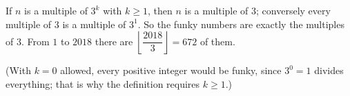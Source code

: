 If $n$ is a multiple of $3^k$ with $k\ge1$, then $n$ is a multiple of $3$; conversely every multiple of $3$ is a multiple of $3^1$. So the funky numbers are exactly the multiples of $3$. From $1$ to $2018$ there are $\left\lfloor\dfrac{2018}{3}\right\rfloor=\boxed{672}$ of them.

(With $k=0$ allowed, every positive integer would be funky, since $3^0=1$ divides everything; that is why the definition requires $k\ge1$.)
